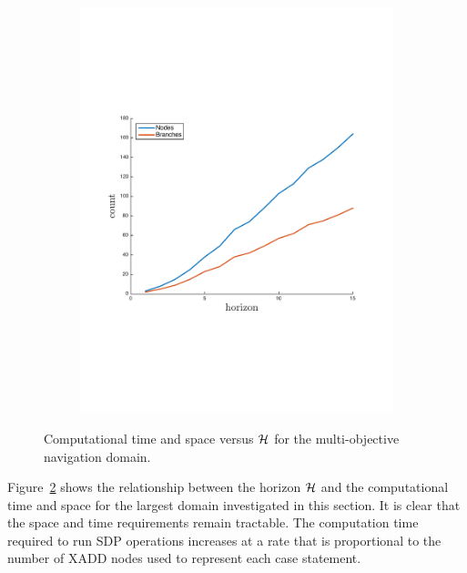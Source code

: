 \begin{figure}[h!]
\begin{subfigure}[b]{0.23\textwidth}
        \includegraphics[width=\linewidth]{images/space_plot_new}
        \label{fig:space_complexity}        
    \end{subfigure}    
    \caption{Computational time and space versus {\footnotesize $ \mathcal{H} $} for the multi-objective navigation domain.}
    \label{fig:time_space_complexity}    
\end{figure}

Figure~\ref{fig:time_space_complexity} shows the relationship between the horizon {\footnotesize $ \mathcal{H} $} and the computational time and space for the largest domain investigated in this section. It is clear that the space and time requirements remain tractable. The computation time required to run SDP operations increases at a rate that is proportional to the number of XADD nodes used to represent each case statement.